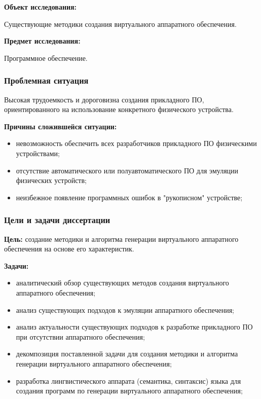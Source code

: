 \begin{frame}%
    \begin{center}
        \textbf{Объект исследования:}

        Существующие методики создания виртуального аппаратного
        обеспечения.

        \textbf{Предмет исследования:}

        Программное обеспечение.
    \end{center}
\end{frame}


\begin{frame}%
    \frametitle{Проблемная ситуация}

    Высокая трудоемкость и дороговизна создания прикладного ПО, ориентированного
    на использование конкретного физического устройства.

    \textbf{Причины сложившейся ситуации:}
    \begin{itemize}
        \item невозможность обеспечить всех разработчиков прикладного ПО физическими устройствами;
        \item отсутствие автоматического или полуавтоматического ПО для эмуляции физических устройств;
        \item неизбежное появление программных ошибок в "рукописном" устройстве;
    \end{itemize}
\end{frame}


\begin{frame}%
    \frametitle{Цели и задачи диссертации}
    \textbf{Цель:} создание методики и алгоритма генерации виртуального аппаратного обеспечения на основе его характеристик.

    \textbf{Задачи:}
    \begin{itemize}
        \item аналитический обзор существующих методов создания виртуального аппаратного обеспечения;
        \item анализ существующих подходов к эмуляции аппаратного обеспечения;
        \item анализ актуальности существующих подходов к разработке прикладного ПО при отсутствии аппаратного обеспечения;
        \item декомпозиция поставленной задачи для создания методики и алгоритма генерации виртуального аппаратного обеспечения;
        \item разработка лингвистического аппарата (семантика, синтаксис) языка для создания программ по генерации виртуального
            аппаратного обеспечения;
    \end{itemize}
\end{frame}


